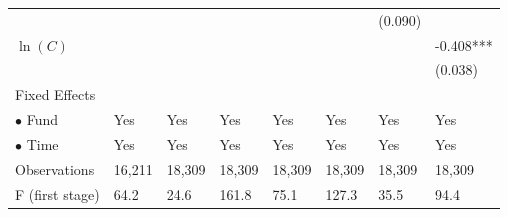 \documentclass[openany]{book}
\theoremstyle{definition}
\theoremstyle{definition}
\theoremstyle{definition}
\theoremstyle{remark}
\begin{document}
\begin{table}[ht]
\begin{tabularx}{0.975\textwidth}{lYYYYYYY}
   &  &  &  &  &  & (0.090) &  \\ 
  $\ln(C)$ &  &  &  &  &  &  & -0.408*** \\ 
   &  &  &  &  &  &  & (0.038) \\ 
  Fixed Effects &  &  &  &  &  &  &  \\ 
  $\bullet$ Fund & Yes & Yes & Yes & Yes & Yes & Yes & Yes \\ 
  $\bullet$ Time & Yes & Yes & Yes & Yes & Yes & Yes & Yes \\ 
  Observations & 16,211 & 18,309 & 18,309 & 18,309 & 18,309 & 18,309 & 18,309 \\ 
  F (first stage) & 64.2 & 24.6 & 161.8 & 75.1 & 127.3 & 35.5 & 94.4 \\ 
   \bottomrule
\end{tabularx}
\endgroup
\end{table}
\end{document}
